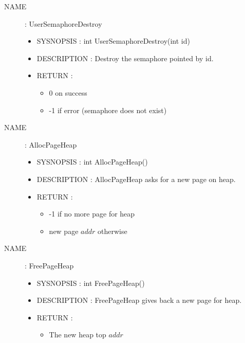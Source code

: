 \documentclass[a4paper,10pt]{article}
\begin{document}
\begin{description}
    \item [NAME] : UserSemaphoreDestroy
        \begin{itemize}
            \item SYSNOPSIS : int UserSemaphoreDestroy(int id)
            \item DESCRIPTION :
                Destroy the semaphore pointed by id.
            \item RETURN :
                \begin{itemize}
                    \item 0 on success
                    \item -1 if error (semaphore does not exist)
                \end{itemize}
        \end{itemize}

    \item [NAME] : AllocPageHeap
        \begin{itemize}
            \item SYSNOPSIS : int AllocPageHeap()
            \item DESCRIPTION :
                AllocPageHeap asks for a new page on heap.
            \item RETURN :
                \begin{itemize}
                    \item -1 if no more page for heap
                    \item new page $addr$ otherwise
                \end{itemize}
        \end{itemize}

    \item [NAME] : FreePageHeap
        \begin{itemize}
            \item SYSNOPSIS : int FreePageHeap()
            \item DESCRIPTION :
                FreePageHeap gives back a new page for heap.
            \item RETURN :
                \begin{itemize}
                    \item The new heap top $addr$
                \end{itemize}
        \end{itemize}


\end{description}
\end{document}
